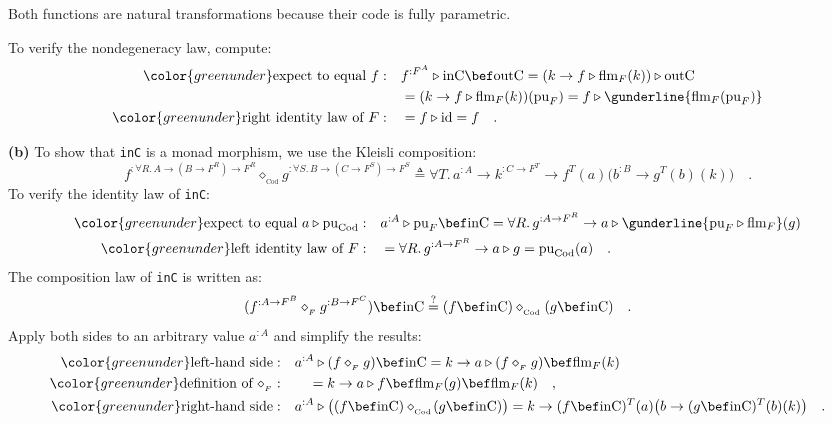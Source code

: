 Both functions are natural transformations because their code is fully
parametric.

To verify the nondegeneracy law, compute:
\begin{align*}
{\color{greenunder}\text{expect to equal }f:}\quad & f^{:F^{A}}\triangleright\text{inC}\bef\text{outC}=(k\rightarrow f\triangleright\text{flm}_{F}(k))\triangleright\text{outC}\\
 & =(k\rightarrow f\triangleright\text{flm}_{F}(k))(\text{pu}_{F})=f\triangleright\gunderline{\text{flm}_{F}(\text{pu}_{F})}\\
{\color{greenunder}\text{right identity law of }F:}\quad & =f\triangleright\text{id}=f\quad.
\end{align*}

\textbf{(b)} To show that \lstinline!inC! is a monad morphism, we
use the Kleisli composition:
\[
f^{:\forall R.\,A\rightarrow(B\rightarrow F^{R})\rightarrow F^{R}}\diamond_{_{\text{Cod}}}g^{:\forall S.\,B\rightarrow(C\rightarrow F^{S})\rightarrow F^{S}}\triangleq\forall T.\,a^{:A}\rightarrow k^{:C\rightarrow F^{T}}\rightarrow f^{T}(a)\big(b^{:B}\rightarrow g^{T}(b)(k)\big)\quad.
\]
To verify the identity law of \lstinline!inC!:
\begin{align*}
{\color{greenunder}\text{expect to equal }a\triangleright\text{pu}_{\text{Cod}}:}\quad & a^{:A}\triangleright\text{pu}_{F}\bef\text{inC}=\forall R.\,g^{:A\rightarrow F^{R}}\rightarrow a\triangleright\gunderline{\text{pu}_{F}\triangleright\text{flm}_{F}}(g)\\
{\color{greenunder}\text{left identity law of }F:}\quad & =\forall R.\,g^{:A\rightarrow F^{R}}\rightarrow a\triangleright g=\text{pu}_{\text{Cod}}(a)\quad.
\end{align*}
The composition law of \lstinline!inC! is written as:
\[
(f^{:A\rightarrow F^{B}}\diamond_{_{F}}g^{:B\rightarrow F^{C}})\bef\text{inC}\overset{?}{=}(f\bef\text{inC})\diamond_{_{\text{Cod}}}(g\bef\text{inC})\quad.
\]
Apply both sides to an arbitrary value $a^{:A}$ and simplify the
results:
\begin{align*}
{\color{greenunder}\text{left-hand side}:}\quad & a^{:A}\triangleright(f\diamond_{_{F}}g)\bef\text{inC}=k\rightarrow a\triangleright(f\diamond_{_{F}}g)\bef\text{flm}_{F}(k)\\
{\color{greenunder}\text{definition of }\diamond_{_{F}}:}\quad & \quad=k\rightarrow a\triangleright f\bef\text{flm}_{F}(g)\bef\text{flm}_{F}(k)\quad,\\
{\color{greenunder}\text{right-hand side}:}\quad & a^{:A}\triangleright\big((f\bef\text{inC})\diamond_{_{\text{Cod}}}\!(g\bef\text{inC})\big)=k\rightarrow(f\bef\text{inC})^{T}(a)\big(b\rightarrow(g\bef\text{inC})^{T}(b)(k)\big)\quad.
\end{align*}
